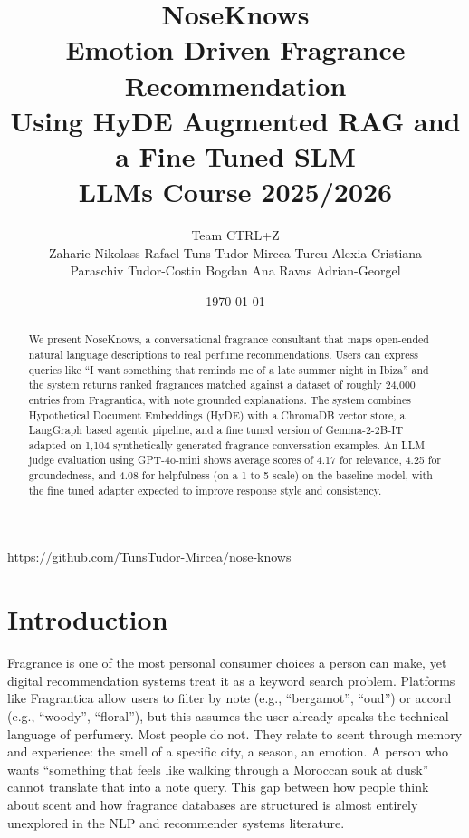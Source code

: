 \documentclass[11pt,a4paper]{article}
\title{%
  \vspace{-1cm}
  {\LARGE\bfseries\color{darkblue} NoseKnows}\\[6pt]
  {\large Emotion Driven Fragrance Recommendation\\
  Using HyDE Augmented RAG and a Fine Tuned SLM}\\[10pt]
  {\normalsize LLMs Course 2025/2026}
}
\author{
  Team CTRL+Z\\
  \small Zaharie Nikolass-Rafael \quad Tuns Tudor-Mircea \quad Turcu Alexia-Cristiana\\
  \small Paraschiv Tudor-Costin \quad Bogdan Ana \quad Ravas Adrian-Georgel
}
\date{\today}
\begin{document}
\maketitle
\thispagestyle{fancy}

\begin{center}
\small\url{https://github.com/TunsTudor-Mircea/nose-knows}
\end{center}

\begin{abstract}
We present NoseKnows, a conversational fragrance consultant that maps open-ended natural language descriptions to real perfume recommendations. Users can express queries like ``I want something that reminds me of a late summer night in Ibiza'' and the system returns ranked fragrances matched against a dataset of roughly 24,000 entries from Fragrantica, with note grounded explanations. The system combines Hypothetical Document Embeddings (HyDE) with a ChromaDB vector store, a LangGraph based agentic pipeline, and a fine tuned version of Gemma-2-2B-IT adapted on 1,104 synthetically generated fragrance conversation examples. An LLM judge evaluation using GPT-4o-mini shows average scores of 4.17 for relevance, 4.25 for groundedness, and 4.08 for helpfulness (on a 1 to 5 scale) on the baseline model, with the fine tuned adapter expected to improve response style and consistency.
\end{abstract}

\section{Introduction}

Fragrance is one of the most personal consumer choices a person can make, yet digital recommendation systems treat it as a keyword search problem. Platforms like Fragrantica allow users to filter by note (e.g., ``bergamot'', ``oud'') or accord (e.g., ``woody'', ``floral''), but this assumes the user already speaks the technical language of perfumery. Most people do not. They relate to scent through memory and experience: the smell of a specific city, a season, an emotion. A person who wants ``something that feels like walking through a Moroccan souk at dusk'' cannot translate that into a note query. This gap between how people think about scent and how fragrance databases are structured is almost entirely unexplored in the NLP and recommender systems literature.
\end{document}
